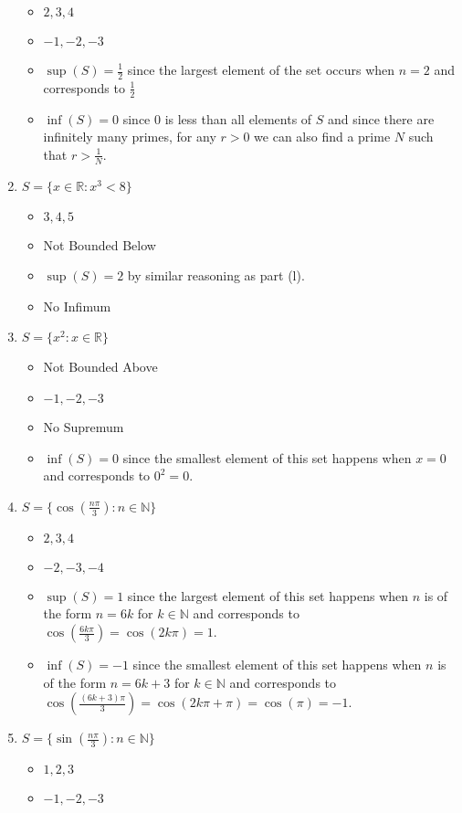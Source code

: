 \documentclass[10pt,a4paper]{article}
\theoremstyle{definition}
\begin{document}
\begin{enumerate}[label = (\alph*)]
\begin{itemize}
\item $2, 3, 4$
\item $-1, -2, -3$
\item $\sup(S) = \frac{1}{2}$ since the largest element of the set occurs when $n = 2$ and corresponds to $\frac{1}{2}$
\item $\inf(S) = 0$ since 0 is less than all elements of $S$ and since there are infinitely many primes, for any $r > 0$ we can also find a prime $N$ such that $r > \frac{1}{N}$.
\end{itemize}
\item $S = \{x \in \mathbb{R} : x^3 < 8\}$
\begin{itemize}
\item $3, 4, 5$
\item Not Bounded Below
\item $\sup(S) = 2$ by similar reasoning as part (l).
\item No Infimum
\end{itemize}
\item $S = \{x^2 : x \in \mathbb{R}\}$
\begin{itemize}
\item Not Bounded Above
\item $-1, -2, -3$
\item No Supremum
\item $\inf(S) = 0$ since the smallest element of this set happens when $x = 0$ and corresponds to $0^2 = 0$. 
\end{itemize}
\item $S = \{\cos(\frac{n\pi}{3}) : n \in \mathbb{N}\}$
\begin{itemize}
\item $2, 3, 4$
\item $-2, -3, -4$
\item $\sup(S) = 1$ since the largest element of this set happens when $n$ is of the form $n = 6k$ for $k \in \mathbb{N}$ and corresponds to $\cos(\frac{6k\pi}{3}) = \cos(2k\pi) = 1$.
\item $\inf(S) = -1$ since the smallest element of this set happens when $n$ is of the form $n = 6k + 3$ for $k \in \mathbb{N}$ and corresponds to $\cos(\frac{(6k + 3)\pi}{3}) = \cos(2k\pi + \pi) = \cos(\pi) = -1$.
\end{itemize}
\item $S = \{\sin(\frac{n\pi}{3}) : n \in \mathbb{N}\}$
\begin{itemize}
\item $1, 2, 3$
\item $-1, -2, -3$

\end{itemize}
\end{enumerate}
\end{document}
